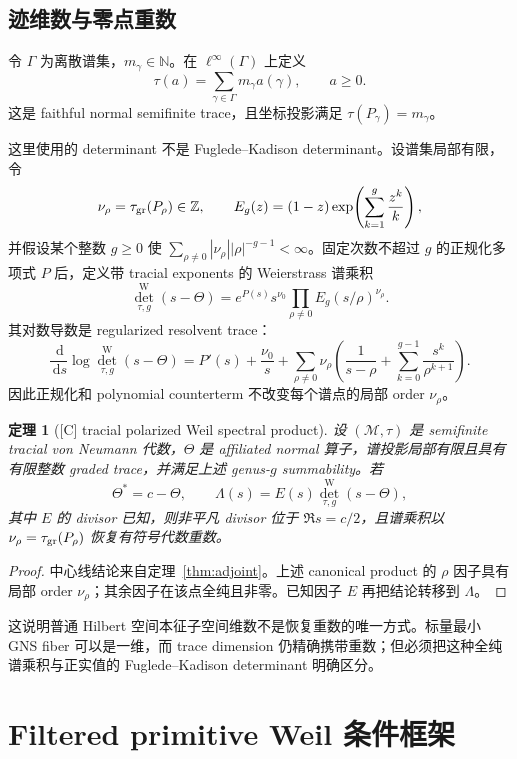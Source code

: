 \documentclass[UTF8,11pt,a4paper]{ctexart}
\newtheorem{theorem}{定理}[section]
\theoremstyle{definition}
\theoremstyle{remark}
\newcommand{\N}{\mathbb N}
\newcommand{\dd}{\,\mathrm d}
\newcommand{\1}{\mathbf 1}
\newcommand{\cM}{\mathcal M}
\newcommand{\statusC}{\textnormal{[C]}}
\begin{document}
\subsection{迹维数与零点重数}

令 $\Gamma$ 为离散谱集，$m_\gamma\in\N$。在 $\ell^\infty(\Gamma)$ 上定义
\[
  \tau(a)=\sum_{\gamma\in\Gamma}m_\gamma a(\gamma),\qquad a\geq0.
\]
这是 faithful normal semifinite trace，且坐标投影满足 $\tau(P_\gamma)=m_\gamma$。

这里使用的 determinant 不是 Fuglede--Kadison determinant。设谱集局部有限，令
\[
 \nu_\rho=\tau_{\rm gr}(P_\rho)\in\mathbb Z,
 \qquad
 E_g(z)=(1-z)\exp\!\left(\sum_{k=1}^{g}\frac{z^k}{k}\right),
\]
并假设某个整数 $g\geq0$ 使
$\sum_{\rho\ne0}|\nu_\rho||\rho|^{-g-1}<\infty$。固定次数不超过 $g$ 的正规化多项式 $P$ 后，定义带 tracial exponents 的 Weierstrass 谱乘积
\[
 \det^{\mathrm W}_{\tau,g}(s-\Theta)
 =e^{P(s)}s^{\nu_0}\prod_{\rho\ne0}E_g(s/\rho)^{\nu_\rho}.
\]
其对数导数是 regularized resolvent trace：
\[
 \frac{\dd}{\dd s}\log\det^{\mathrm W}_{\tau,g}(s-\Theta)
 =P'(s)+\frac{\nu_0}{s}
  +\sum_{\rho\ne0}\nu_\rho
   \left(\frac1{s-\rho}+\sum_{k=0}^{g-1}\frac{s^k}{\rho^{k+1}}\right).
\]
因此正规化和 polynomial counterterm 不改变每个谱点的局部 order $\nu_\rho$。

\begin{theorem}[\statusC{} tracial polarized Weil spectral product]
设 $(\cM,\tau)$ 是 semifinite tracial von Neumann 代数，$\Theta$ 是 affiliated normal 算子，谱投影局部有限且具有有限整数 graded trace，并满足上述 genus-$g$ summability。若
\[
  \Theta^*=c-\Theta,\qquad
  \Lambda(s)=E(s)\det^{\mathrm W}_{\tau,g}(s-\Theta),
\]
其中 $E$ 的 divisor 已知，则非平凡 divisor 位于 $\Re s=c/2$，且谱乘积以 $\nu_\rho=\tau_{\rm gr}(P_\rho)$ 恢复有符号代数重数。
\end{theorem}

\begin{proof}
中心线结论来自定理~\ref{thm:adjoint}。上述 canonical product 的 $\rho$ 因子具有局部 order $\nu_\rho$；其余因子在该点全纯且非零。已知因子 $E$ 再把结论转移到 $\Lambda$。
\end{proof}

这说明普通 Hilbert 空间本征子空间维数不是恢复重数的唯一方式。标量最小 GNS fiber 可以是一维，而 trace dimension 仍精确携带重数；但必须把这种全纯谱乘积与正实值的 Fuglede--Kadison determinant 明确区分。

\section{Filtered primitive Weil 条件框架}
\end{document}
